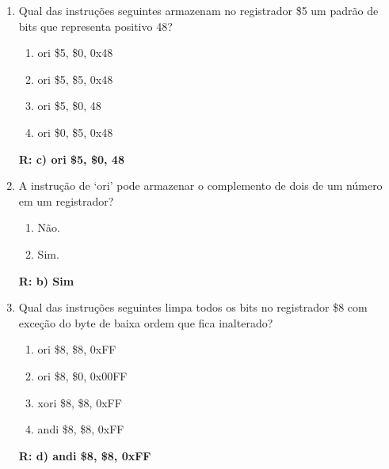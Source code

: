 \documentclass[a4paper,11pt]{article}
\begin{document}
\begin{enumerate}
    \item{Qual das instruções seguintes armazenam no registrador \$5 um padrão de bits que
            representa positivo 48?}
        \begin{enumerate}
            \item{ori \$5, \$0, 0x48}
            \item{ori \$5, \$5, 0x48}
            \item{ori \$5, \$0, 48}
            \item{ori \$0, \$5, 0x48}
        \end{enumerate}
        \textbf{R: c) ori \$5, \$0, 48}

    \item{A instrução de `ori' pode armazenar o complemento de dois de um número em um registrador?}
        \begin{enumerate}
            \item{Não.}
            \item{Sim.}
        \end{enumerate}
        \textbf{R: b) Sim}

    \item{Qual das instruções seguintes limpa todos os bits no registrador \$8 com exceção do byte de
            baixa ordem que fica inalterado?}
        \begin{enumerate}
            \item{ori \$8, \$8, 0xFF}
            \item{ori \$8, \$0, 0x00FF}
            \item{xori \$8, \$8, 0xFF}
            \item{andi \$8, \$8, 0xFF}
        \end{enumerate}
        \textbf{R: d) andi \$8, \$8, 0xFF }


\end{enumerate}
\end{document}
